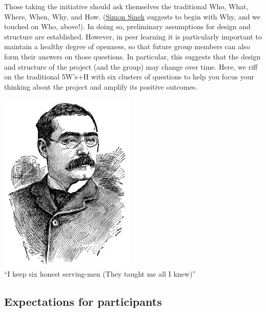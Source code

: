 Those taking the initiative should ask themselves the traditional Who,
What, Where, When, Why, and How.
(\href{http://en.wikipedia.org/wiki/Simon\_Sinek}{Simon Sinek} suggests
to begin with Why, and we touched on Who, above!). In doing so,
preliminary assumptions for design and structure are established.
However, in peer learning it is particularly important to maintain a
healthy degree of openness, so that future group members can also form
their answers on those questions. In particular, this suggests that the
design and structure of the project (and the group) may change over
time. Here, we riff on the traditional 5W's+H with six clusters of
questions to help you focus your thinking about the project and amplify
its positive outcomes.

\begin{center}
\includegraphics[width=.5\textwidth]{../pictures/kipling.jpg} \\
``I keep six honest serving-men (They taught me all I knew)''
\end{center}

\subsection{Expectations for participants}

